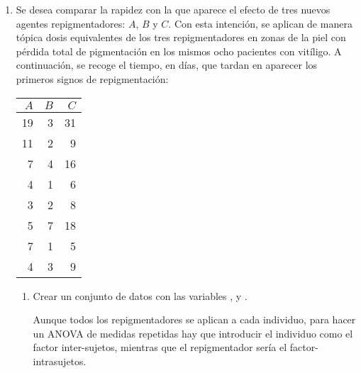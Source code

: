 \begin{enumerate}[leftmargin=*]
\begin{enumerate}
\item Calcular los intervalos de confianza para la diferencia de medias en el tiempo de aprendizaje entre los grupos que
surgen de la interacción del sexo con el método de aprendizaje.
\begin{indicacion}{
\begin{enumerate}
\item Seleccionar el menú \texttt{Teaching\flecha Tests paramétricos\flecha Medias\flecha ANOVA}.
\item En el cuadro de diálogo que aparece, seleccionar el conjunto de datos .
\item Seleccionar la variable  como  y las variables
 y  en el campo .
\item En la solapa  seleccionar la opción  y hacer
click sobre el botón .
\end{enumerate}
}
\end{indicacion}
\end{enumerate}


\item Se desea comparar la rapidez con la que aparece el efecto de tres nuevos agentes repigmentadores: $A$, $B$ y $C$.
Con esta intención, se aplican de manera tópica dosis equivalentes de los tres repigmentadores en zonas de la piel con
pérdida total de pigmentación en los mismos ocho pacientes con vitíligo. A continuación, se recoge el tiempo, en días,
que tardan en aparecer los primeros signos de repigmentación:
\begin{center}
\begin{tabular}{rrr}
\hline
$A$ & $B$ & $C$ \\
\hline
19 & 3 & 31 \\
11 & 2 & 9 \\
7 & 4 & 16 \\
4 & 1 & 6 \\
3 & 2 & 8 \\
5 & 7 & 18 \\
7 & 1 & 5 \\
4 & 3 & 9 \\
\hline
\end{tabular}
\end{center}

\begin{enumerate}
\item Crear un conjunto de datos  con las variables ,  y
.
\begin{indicacion}{Aunque todos los repigmentadores se aplican a cada individuo, para hacer un ANOVA de medidas
repetidas hay que introducir el individuo como el factor inter-sujetos, mientras que el repigmentador sería el
factor-intrasujetos.}
\end{indicacion}


\end{enumerate}
\end{enumerate}
